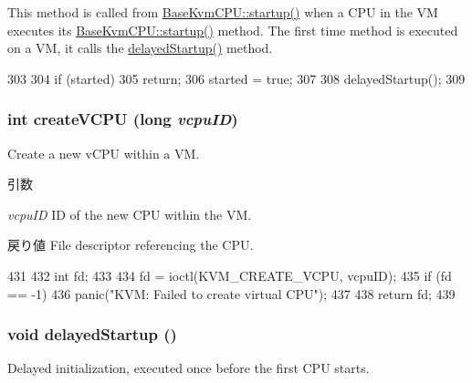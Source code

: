 This method is called from \hyperlink{classBaseKvmCPU_aecc7d8debf54990ffeaaed5bac7d7d81}{BaseKvmCPU::startup()} when a CPU in the VM executes its \hyperlink{classBaseKvmCPU_aecc7d8debf54990ffeaaed5bac7d7d81}{BaseKvmCPU::startup()} method. The first time method is executed on a VM, it calls the \hyperlink{classKvmVM_a508d2bd176120153c08b1fe4c7e2bc2c}{delayedStartup()} method. 


\begin{DoxyCode}
303 {
304     if (started)
305         return;
306     started = true;
307 
308     delayedStartup();
309 }
\end{DoxyCode}
\hypertarget{classKvmVM_a3841d0c536bfa3b8f3b4e8ef5a46039b}{
\subsubsection[{createVCPU}]{\setlength{\rightskip}{0pt plus 5cm}int createVCPU (long {\em vcpuID})}}
\label{classKvmVM_a3841d0c536bfa3b8f3b4e8ef5a46039b}
Create a new vCPU within a VM.


\begin{DoxyParams}{引数}
\item[{\em vcpuID}]ID of the new CPU within the VM. \end{DoxyParams}
\begin{DoxyReturn}{戻り値}
File descriptor referencing the CPU. 
\end{DoxyReturn}



\begin{DoxyCode}
431 {
432     int fd;
433 
434     fd = ioctl(KVM_CREATE_VCPU, vcpuID);
435     if (fd == -1)
436         panic("KVM: Failed to create virtual CPU");
437 
438     return fd;
439 }
\end{DoxyCode}
\hypertarget{classKvmVM_a508d2bd176120153c08b1fe4c7e2bc2c}{
\subsubsection[{delayedStartup}]{\setlength{\rightskip}{0pt plus 5cm}void delayedStartup ()}}
\label{classKvmVM_a508d2bd176120153c08b1fe4c7e2bc2c}
Delayed initialization, executed once before the first CPU starts.

